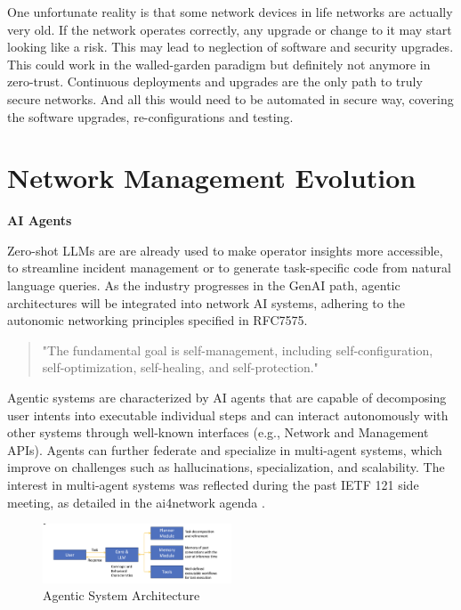 \documentclass[11pt,sigconf]{iabart}
\begin{document}
One unfortunate reality is that some network devices in life networks are actually very old. If the network operates correctly, any upgrade or change to it may start looking like a risk. This may lead to neglection of software and security upgrades. This could work in the walled-garden paradigm but definitely not anymore in zero-trust. Continuous deployments and upgrades are the only path to truly secure networks. And all this would need to be automated in secure way, covering the software upgrades, re-configurations and testing.

 
\section{Network Management Evolution} \label{insights}




\textbf{AI Agents}

Zero-shot LLMs are are already used to make operator insights more accessible, to streamline incident management or to generate task-specific code from natural language queries. As the industry progresses in the GenAI path, agentic architectures will be integrated into network AI systems, adhering to the autonomic networking principles specified in RFC7575.

\begin{quote}
"The fundamental goal is self-management, including self-configuration, self-optimization, self-healing, and self-protection." \cite{RFC7575}
\end{quote}

Agentic systems are characterized by AI agents that are capable of decomposing user intents into executable individual steps and can interact autonomously with other systems through well-known interfaces (e.g., Network and Management APIs). Agents can further federate and specialize in multi-agent systems, which improve on challenges such as hallucinations, specialization, and scalability. The interest in multi-agent systems was reflected during the past IETF 121 side meeting, as detailed in the ai4network agenda \cite{ai4network-agenda}. 

\begin{figure}[h]
  \centering
  \includegraphics[width=0.5\textwidth]{figs/agent.png}
  \caption{Agentic System Architecture}
  \label{fig:agent_architecture}
\end{figure}
\end{document}
